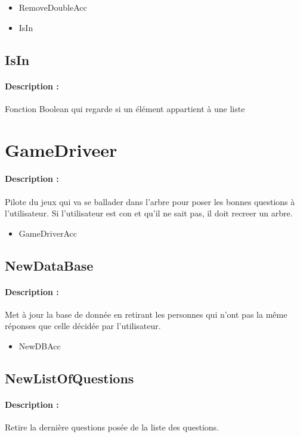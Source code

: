 \documentclass[10pt,a4paper]{article}
\begin{document}
\begin{itemize}
\item RemoveDoubleAcc
\item IsIn
\end{itemize}

\subsection{IsIn}
\paragraph{Description :} Fonction Boolean qui regarde si un élément appartient à une liste

\section{GameDriveer}
\paragraph{Description :} Pilote du jeux qui va se ballader dans l'arbre pour poser les bonnes questions à l'utilisateur. Si l'utilisateur est con et qu'il ne sait pas, il doit recreer un arbre.

\begin{itemize}
\item GameDriverAcc
\end{itemize}

\subsection{NewDataBase}
\paragraph{Description :} Met à jour la base de donnée en retirant les personnes qui n'ont pas la même réponses que celle décidée par l'utilisateur.

\begin{itemize}
\item NewDBAcc
\end{itemize}

\subsection{NewListOfQuestions}
\paragraph{Description :} Retire la dernière questions posée de la liste des questions.
\end{document}
